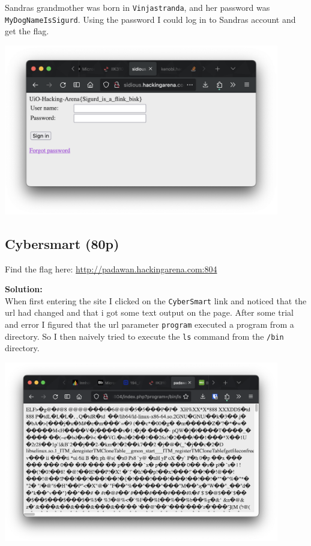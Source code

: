 Sandras grandmother was born in \texttt{Vinjastranda}, and her password was \texttt{MyDogNameIsSigurd}. Using the password I could log in to Sandras account and get the flag.

\begin{center}
    \includegraphics[width=12cm]{img/Web hacking/Arenabook/Skjermbilde 2023-10-26 kl. 14.55.36.png}
\end{center}

\subsection{Cybersmart (80p)}
Find the flag here: \url{http://padawan.hackingarena.com:804}

\textbf{Solution:}\\

When first entering the site I clicked on the \texttt{CyberSmart} link and noticed that the url had changed and that i got some text output on the page.
After some trial and error I figured that the url parameter \texttt{program} executed a program from a directory. So I then naively tried to execute the \texttt{ls} command from the \texttt{/bin} directory.

\begin{center}
    \includegraphics[width=12cm]{img/Web hacking/Cybersmart/Screenshot 2023-11-09 at 14.03.33.png}
\end{center}


